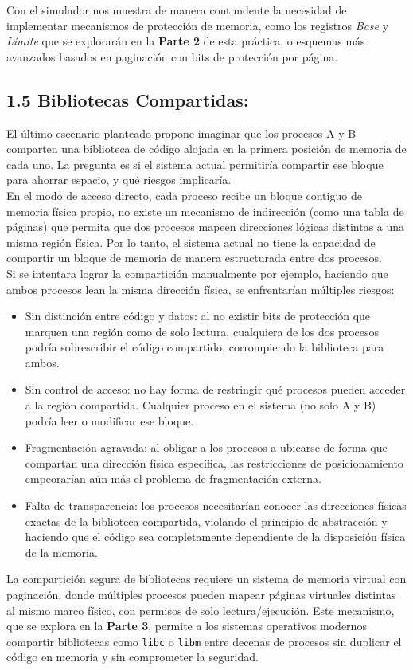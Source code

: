 \documentclass[12pt,letterpaper]{article}
\begin{document}
Con el simulador nos muestra de manera contundente la necesidad de implementar mecanismos de protección de
memoria, como los registros \textit{Base} y \textit{Límite} que se explorarán en la \textbf{Parte 2} de esta
práctica, o esquemas más avanzados basados en paginación con bits de protección por página.

\subsection*{1.5 Bibliotecas Compartidas:}
El último escenario planteado propone imaginar que los procesos A y B comparten una biblioteca de código alojada
en la primera posición de memoria de cada uno. La pregunta es si el sistema actual permitiría compartir ese
bloque para ahorrar espacio, y qué riesgos implicaría.\\

En el modo de acceso directo, cada proceso recibe un bloque contiguo de memoria física propio, no existe un
mecanismo de indirección (como una tabla de páginas) que permita que dos procesos mapeen direcciones lógicas
distintas a una misma región física. Por lo tanto, el sistema actual no tiene la capacidad de compartir un
bloque de memoria de manera estructurada entre dos procesos.\\
    
Si se intentara lograr la compartición manualmente por ejemplo, haciendo que ambos procesos lean la misma
dirección física, se enfrentarían múltiples riesgos:
\begin{itemize}
\item Sin distinción entre código y datos: al no existir bits de protección que marquen una región como de solo
  lectura, cualquiera de los dos procesos podría sobrescribir el código compartido, corrompiendo la biblioteca
  para ambos.
\item Sin control de acceso: no hay forma de restringir qué procesos pueden acceder a la región compartida.
  Cualquier proceso en el sistema (no solo A y B) podría leer o modificar ese bloque.
\item Fragmentación agravada: al obligar a los procesos a ubicarse de forma que compartan una dirección física
  específica, las restricciones de posicionamiento empeorarían aún más el problema de fragmentación externa.
\item Falta de transparencia: los procesos necesitarían conocer las direcciones físicas exactas de la biblioteca
  compartida, violando el principio de abstracción y haciendo que el código sea completamente dependiente de la
  disposición física de la memoria.
\end{itemize}
La compartición segura de bibliotecas requiere un sistema de memoria virtual con paginación, donde múltiples
procesos pueden mapear páginas virtuales distintas al mismo marco físico, con permisos de solo lectura/ejecución.
Este mecanismo, que se explora en la \textbf{Parte 3}, permite a los sistemas operativos modernos compartir
bibliotecas como \texttt{libc} o \texttt{libm} entre decenas de procesos sin duplicar el código en memoria y sin
comprometer la seguridad.
\end{document}
